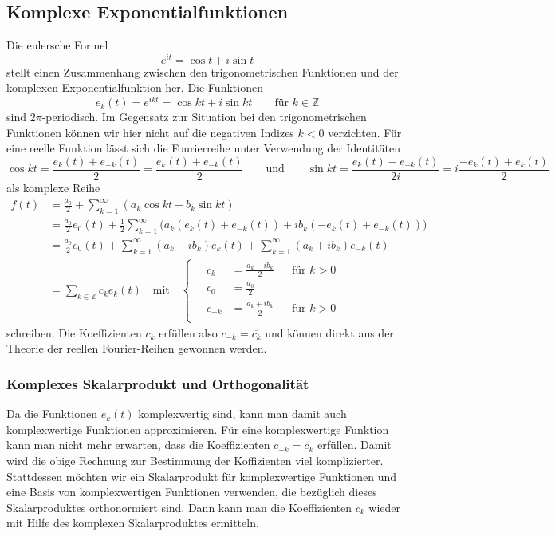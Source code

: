 \subsection{Komplexe Exponentialfunktionen}
Die eulersche Formel
\[
e^{it} = \cos t + i\sin t
\]
stellt einen Zusammenhang zwischen den trigonometrischen Funktionen
und der komplexen Exponentialfunktion her.
Die Funktionen
\[
e_k(t) = e^{ikt} = \cos kt + i\sin kt\qquad\text{für $k\in\mathbb{Z}$}
\]
sind $2\pi$-periodisch.
Im Gegensatz zur Situation bei den trigonometrischen Funktionen können
wir hier nicht auf die negativen Indizes $k<0$ verzichten.
Für eine reelle Funktion lässt sich die Fourierreihe unter Verwendung
der Identitäten
\[
\cos kt
=
\frac{e_k(t) + e_{-k}(t)}{2}
=
\frac{e_k(t) + e_{-k}(t)}2
\qquad\text{und}\qquad
\sin kt
=
\frac{e_k(t) - e_{-k}(t)}{2i}
=
i\frac{-e_{k}(t)+e_k(t)}2
\]
als komplexe Reihe 
\begin{align*}
f(t)
&=
\frac{a_0}2
+\sum_{k=1}^\infty (a_k\cos kt + b_k \sin kt)
\\
&=
\frac{a_0}2 e_0(t)
+
\frac12
\sum_{k=1}^\infty
\bigl(
a_k(e_k(t)+e_{-k}(t))
+
ib_k(-e_k(t)+e_{-k}(t))
\bigr)
\\
&=
\frac{a_0}2e_0(t)
+
\sum_{k=1}^\infty (a_k-ib_k)e_k(t)
+
\sum_{k=1}^\infty (a_k+ib_k)e_{-k}(t)
\\
&=\sum_{k\in\mathbb{Z}} c_ke_k(t)
\quad\text{mit}\quad
\left\{\quad
\begin{aligned}
c_k    &= \frac{a_k-ib_k}2&&\text{für $k>0$}\\
c_0    &= \frac{a_0}2     &&                \\
c_{-k} &= \frac{a_k+ib_k}2&&\text{für $k>0$}\\
\end{aligned}
\right.
\end{align*}
schreiben.
Die Koeffizienten $c_k$ erfüllen also $c_{-k}=\overline{c_k}$
und können direkt aus der Theorie der reellen Fourier-Reihen
gewonnen werden.

%
%
\subsubsection{Komplexes Skalarprodukt und Orthogonalität}
Da die Funktionen $e_k(t)$ komplexwertig sind, kann man damit
auch komplexwertige Funktionen approximieren. 
Für eine komplexwertige Funktion kann man nicht mehr erwarten, dass die
Koeffizienten $c_{-k}=\overline{c_k}$ erfüllen.
Damit wird die obige Rechnung zur Bestimmung der Koffizienten
viel komplizierter.
Stattdessen möchten wir ein Skalarprodukt für komplexwertige Funktionen
und eine Basis von komplexwertigen Funktionen verwenden, die 
bezüglich dieses Skalarproduktes orthonormiert sind.
Dann kann man die Koeffizienten $c_k$ wieder mit Hilfe des komplexen
Skalarproduktes ermitteln.

